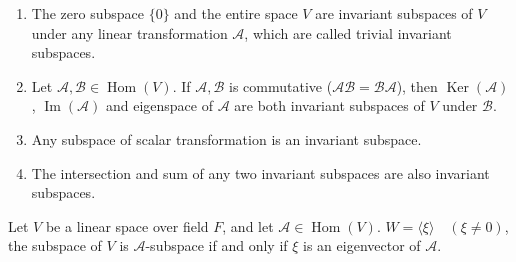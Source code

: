 \documentclass[11pt]{../../TexTemplate/elegantbook} %
\begin{document}
\begin{property}
    \begin{enumerate}
        \item The zero subspace \( \{0\} \) and the entire space \( V \) are invariant subspaces of \( V \) 
            under any linear transformation \( \mathcal{A} \), which are called trivial invariant subspaces. 
        \item Let \( \mathcal{A}, \mathcal{B} \in \operatorname{Hom}(V) \). 
            If \( \mathcal{A}, \mathcal{B} \) is commutative (\( \mathcal{AB} = \mathcal{BA} \)), 
            then \( \operatorname{Ker}(\mathcal{A}) \), \( \operatorname{Im}(\mathcal{A}) \) and 
            eigenspace of \( \mathcal{A} \) are both invariant subspaces of \( V \) under \( \mathcal{B} \).
        \item Any subspace of scalar transformation is an invariant subspace.
        \item The intersection and sum of any two invariant subspaces are also invariant subspaces.
    \end{enumerate}
\end{property}

\begin{proposition}
    Let \( V \) be a linear space over field \( F \), and let \( \mathcal{A}\in \operatorname{Hom}(V) \).
    \( W = \langle \xi \rangle \quad (\xi\neq 0)\), the subspace of \( V \) is \( \mathcal{A} \)-subspace if and only if 
    \( \xi \) is an eigenvector of \( \mathcal{A} \).
\end{proposition}
\end{document}
